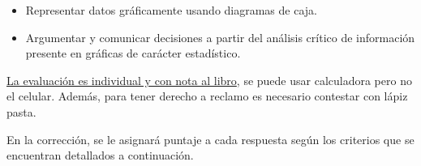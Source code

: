 \documentclass{caes}
\begin{document}
%
\datos
%
\begin{itemize}[nosep]
    \item Representar datos gráficamente usando diagramas de caja.
    \item Argumentar y comunicar decisiones a partir del análisis crítico 
    de información presente en gráficas de carácter estadístico.
\end{itemize}


\underline{La evaluación es individual y con nota al libro}, se puede usar
 calculadora pero no el celular. Además, para tener derecho a reclamo es 
 necesario contestar con lápiz pasta.


En la corrección, se le asignará puntaje a cada respuesta según los criterios 
que se encuentran detallados a continuación.

\end{document}
